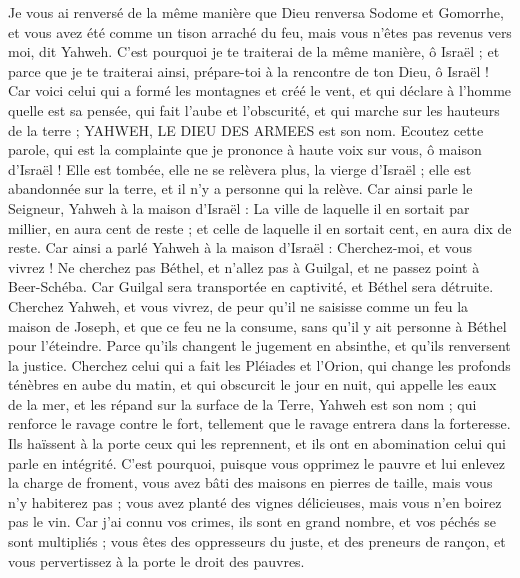 \begin{multicols}{2}
Je vous ai renversé de la même manière que Dieu renversa Sodome et Gomorrhe, et vous avez été comme un tison arraché du feu, mais vous n'êtes pas revenus vers moi, dit Yahweh.
C'est pourquoi je te traiterai de la même manière, ô Israël ; et parce que je te traiterai ainsi, prépare-toi à la rencontre de ton Dieu, ô Israël !
Car voici celui qui a formé les montagnes et créé le vent, et qui déclare à l'homme quelle est sa pensée, qui fait l'aube et l'obscurité, et qui marche sur les hauteurs de la terre ; YAHWEH, LE DIEU DES ARMEES est son nom.
\VerseOne{}Ecoutez cette parole, qui est la complainte que je prononce à haute voix sur vous, ô maison d'Israël !
Elle est tombée, elle ne se relèvera plus, la vierge d'Israël ; elle est abandonnée sur la terre, et il n'y a personne qui la relève.
Car ainsi parle le Seigneur, Yahweh à la maison d'Israël : La ville de laquelle il en sortait par millier, en aura cent de reste ; et celle de laquelle il en sortait cent, en aura dix de reste.
Car ainsi a parlé Yahweh à la maison d'Israël : Cherchez-moi, et vous vivrez !
Ne cherchez pas Béthel, et n'allez pas à Guilgal, et ne passez point à Beer-Schéba. Car Guilgal sera transportée en captivité, et Béthel sera détruite.
Cherchez Yahweh, et vous vivrez, de peur qu'il ne saisisse comme un feu la maison de Joseph, et que ce feu ne la consume, sans qu'il y ait personne à Béthel pour l'éteindre.
Parce qu'ils changent le jugement en absinthe, et qu'ils renversent la justice.
Cherchez celui qui a fait les Pléiades et l'Orion, qui change les profonds ténèbres en aube du matin, et qui obscurcit le jour en nuit, qui appelle les eaux de la mer, et les répand sur la surface de la Terre, Yahweh est son nom ;
qui renforce le ravage contre le fort, tellement que le ravage entrera dans la forteresse.
Ils haïssent à la porte ceux qui les reprennent, et ils ont en abomination celui qui parle en intégrité.
C'est pourquoi, puisque vous opprimez le pauvre et lui enlevez la charge de froment, vous avez bâti des maisons en pierres de taille, mais vous n'y habiterez pas ; vous avez planté des vignes délicieuses, mais vous n'en boirez pas le vin.
Car j'ai connu vos crimes, ils sont en grand nombre, et vos péchés se sont multipliés ; vous êtes des oppresseurs du juste, et des preneurs de rançon, et vous pervertissez à la porte le droit des pauvres. 

\end{multicols}
